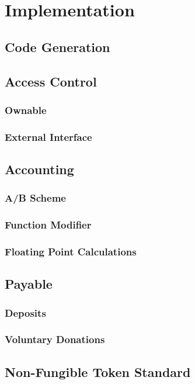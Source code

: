 
\chapter{Implementation}
\label{chp:implementation}

\section{Code Generation}

\section{Access Control}
\subsection{Ownable}
\subsection{External Interface}

\section{Accounting}

\subsection{A/B Scheme}
\subsection{Function Modifier}
\subsection{Floating Point Calculations}

\section{Payable}
\subsection{Deposits}
\subsection{Voluntary Donations}

\section{Non-Fungible Token Standard}